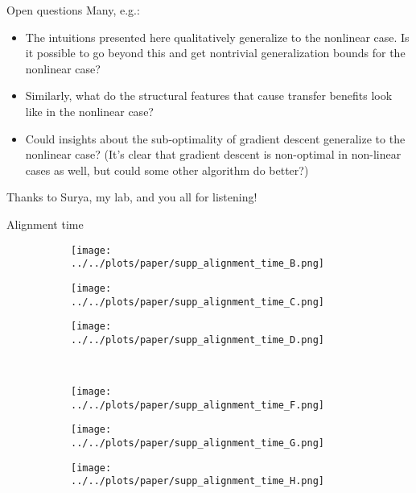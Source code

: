 \documentclass{beamer}
\begin{document}
\begin{frame}{Open questions}
Many, e.g.:
\begin{itemize}
\item The intuitions presented here qualitatively generalize to the nonlinear case. Is it possible to go beyond this and get nontrivial generalization bounds for the nonlinear case? 
\item Similarly, what do the structural features that cause transfer benefits look like in the nonlinear case?
\item Could insights about the sub-optimality of gradient descent generalize to the nonlinear case? (It's clear that gradient descent is non-optimal in non-linear cases as well, but could some other algorithm do better?)
\end{itemize}
\end{frame}

\begin{frame}[standout]
Thanks to Surya, my lab, and you all for listening!
\end{frame}

\begin{frame}[allowframebreaks]


{}

\end{frame}

\appendix
\begin{frame}{Alignment time}
\begin{figure}
\centering
\begin{subfigure}[t]{0.3\textwidth}
\texttt{[image: ../../plots/paper/supp\_alignment\_time\_B.png]}
\end{subfigure}%
\begin{subfigure}[t]{0.3\textwidth}
\texttt{[image: ../../plots/paper/supp\_alignment\_time\_C.png]}
\end{subfigure}%
\begin{subfigure}[t]{0.4\textwidth}
\texttt{[image: ../../plots/paper/supp\_alignment\_time\_D.png]}
\end{subfigure}\\
\begin{subfigure}[t]{0.3\textwidth}
\texttt{[image: ../../plots/paper/supp\_alignment\_time\_F.png]}
\end{subfigure}%
\begin{subfigure}[t]{0.3\textwidth}
\texttt{[image: ../../plots/paper/supp\_alignment\_time\_G.png]}
\end{subfigure}%
\begin{subfigure}[t]{0.4\textwidth}
\texttt{[image: ../../plots/paper/supp\_alignment\_time\_H.png]}
\end{subfigure}
\end{figure}

\end{frame}
\end{document}
